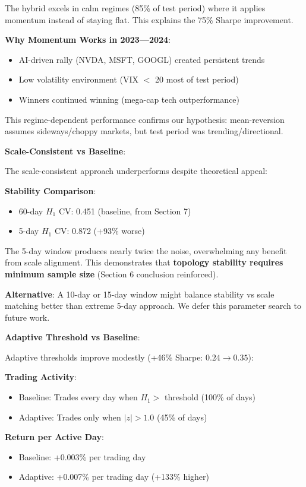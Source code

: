 The hybrid excels in calm regimes (85\% of test period) where it applies momentum instead of staying flat. This explains the 75\% Sharpe improvement.

\textbf{Why Momentum Works in 2023---2024}:
\begin{itemize}
\item AI-driven rally (NVDA, MSFT, GOOGL) created persistent trends
\item Low volatility environment (VIX $<$ 20 most of test period)
\item Winners continued winning (mega-cap tech outperformance)
\end{itemize}

This regime-dependent performance confirms our hypothesis: mean-reversion assumes sideways/choppy markets, but test period was trending/directional.

\textbf{Scale-Consistent vs Baseline}:

The scale-consistent approach underperforms despite theoretical appeal:

\textbf{Stability Comparison}:
\begin{itemize}
\item 60-day $H_1$ CV: 0.451 (baseline, from Section 7)
\item 5-day $H_1$ CV: 0.872 (+93\% worse)
\end{itemize}

The 5-day window produces nearly twice the noise, overwhelming any benefit from scale alignment. This demonstrates that \textbf{topology stability requires minimum sample size} (Section 6 conclusion reinforced).

\textbf{Alternative}: A 10-day or 15-day window might balance stability vs scale matching better than extreme 5-day approach. We defer this parameter search to future work.

\textbf{Adaptive Threshold vs Baseline}:

Adaptive thresholds improve modestly (+46\% Sharpe: $0.24 \rightarrow 0.35$):

\textbf{Trading Activity}:
\begin{itemize}
\item Baseline: Trades every day when $H_1 >$ threshold (100\% of days)
\item Adaptive: Trades only when $|z| > 1.0$ (45\% of days)
\end{itemize}

\textbf{Return per Active Day}:
\begin{itemize}
\item Baseline: +0.003\% per trading day
\item Adaptive: +0.007\% per trading day (+133\% higher)
\end{itemize}

